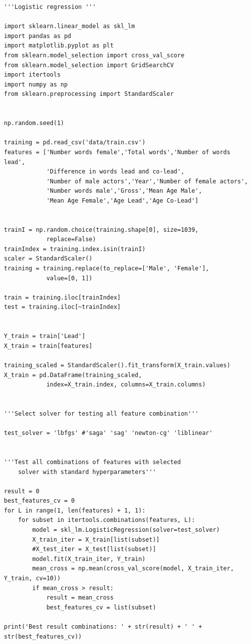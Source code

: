 \documentclass{article}
\begin{document}
\begin{verbatim}
'''Logistic regression '''

import sklearn.linear_model as skl_lm
import pandas as pd
import matplotlib.pyplot as plt
from sklearn.model_selection import cross_val_score
from sklearn.model_selection import GridSearchCV
import itertools
import numpy as np
from sklearn.preprocessing import StandardScaler


np.random.seed(1)

training = pd.read_csv('data/train.csv')
features = ['Number words female','Total words','Number of words lead',
            'Difference in words lead and co-lead',
            'Number of male actors','Year','Number of female actors',
            'Number words male','Gross','Mean Age Male',
            'Mean Age Female','Age Lead','Age Co-Lead']


trainI = np.random.choice(training.shape[0], size=1039, 
            replace=False)
trainIndex = training.index.isin(trainI)
scaler = StandardScaler()
training = training.replace(to_replace=['Male', 'Female'], 
            value=[0, 1])

train = training.iloc[trainIndex]
test = training.iloc[~trainIndex]


Y_train = train['Lead']
X_train = train[features]

training_scaled = StandardScaler().fit_transform(X_train.values)
X_train = pd.DataFrame(training_scaled, 
            index=X_train.index, columns=X_train.columns)


'''Select solver for testing all feature combination'''

test_solver = 'lbfgs' #'saga' 'sag' 'newton-cg' 'liblinear'


'''Test all combinations of features with selected 
    solver with standard hyperparameters'''
    
result = 0
best_features_cv = 0
for L in range(1, len(features) + 1, 1):
    for subset in itertools.combinations(features, L):
        model = skl_lm.LogisticRegression(solver=test_solver)
        X_train_iter = X_train[list(subset)]
        #X_test_iter = X_test[list(subset)]
        model.fit(X_train_iter, Y_train)
        mean_cross = np.mean(cross_val_score(model, X_train_iter, Y_train, cv=10))
        if mean_cross > result:
            result = mean_cross
            best_features_cv = list(subset)

print('Best result combinations: ' + str(result) + ' ' + str(best_features_cv))


\end{verbatim}
\end{document}
